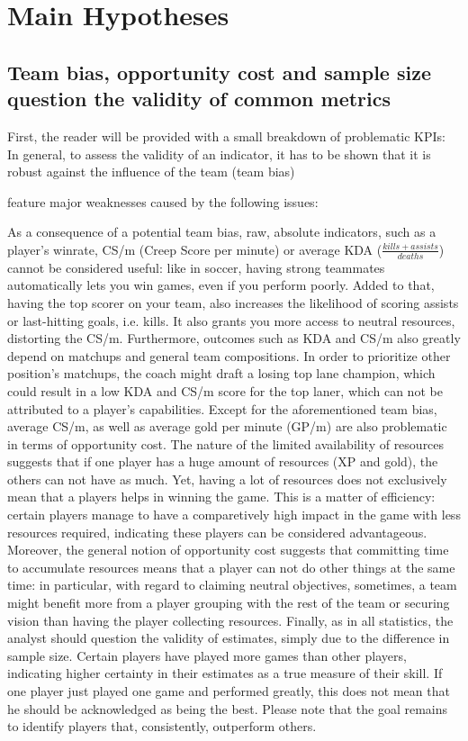 \documentclass{article}
\begin{document}
\section{Main Hypotheses}
\subsection{Team bias, opportunity cost and sample size question the validity of common metrics}
First, the reader will be provided with a small breakdown of problematic KPIs: 
In general, to assess the validity of an indicator, it has to be shown that it is robust against the influence of the team (team bias)

 feature major weaknesses caused by the following issues: 
 
 
 
As a consequence of a potential team bias, raw, absolute indicators, such as a player's winrate, CS/m (Creep Score per minute) or average KDA ($\frac{kills + assists}{deaths}$) cannot be considered useful: like in soccer, having strong teammates automatically lets you win games, even if you perform poorly. Added to that, having the top scorer on your team, also increases the likelihood of scoring assists or last-hitting goals, i.e. kills. It also grants you more access to neutral resources, distorting the CS/m. Furthermore, outcomes such as KDA and CS/m also greatly depend on matchups and general team compositions. In order to prioritize other position's matchups, the coach might draft a losing top lane champion, which could result in a low KDA and CS/m score for the top laner, which can not be attributed to a player's capabilities. \newline
Except for the aforementioned team bias, average CS/m, as well as average gold per minute (GP/m) are also problematic in terms of opportunity cost. The nature of the limited availability of resources suggests that if one player has a huge amount of resources (XP and gold), the others can not have as much. Yet, having a lot of resources does not exclusively mean that a players helps in winning the game.  This is a matter of efficiency: certain players manage to have a comparetively high impact in the game with less resources required, indicating these players can be considered advantageous. Moreover, the general notion of opportunity cost suggests that committing time to accumulate resources means that a player can not do other things at the same time: in particular, with regard to claiming neutral objectives, sometimes, a team might benefit more from a player grouping with the rest of the team or securing vision than having the player collecting resources. 
\newline
Finally, as in all statistics, the analyst should question the validity of estimates, simply due to the difference in sample size. Certain players have played more games than other players, indicating higher certainty in their estimates as a true measure of their skill. If one player just played one game and performed greatly, this does not mean that he should be acknowledged as being the best. Please note that the goal remains to identify players that, consistently, outperform others. 
\end{document}
